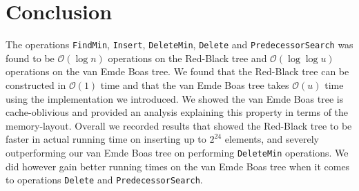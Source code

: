 \documentclass[a4paper,oneside,article,11pt]{memoir}
\begin{document}
\section{Conclusion}
The operations \texttt{FindMin}, \texttt{Insert}, \texttt{DeleteMin}, \texttt{Delete} and \texttt{PredecessorSearch} was found to be $\mathcal{O}(\log n)$ operations on the Red-Black tree and $\mathcal{O}(\log \log u)$ operations on the van Emde Boas tree. We found that the Red-Black tree can be constructed in $\mathcal{O}(1)$ time and that the van Emde Boas tree takes $\mathcal{O}(u)$ time using the implementation we introduced. We showed the van Emde Boas tree is cache-oblivious and provided an analysis explaining this property in terms of the memory-layout. Overall we recorded results that showed the Red-Black tree to be faster in actual running time on inserting up to $2^{24}$ elements, and severely outperforming our van Emde Boas tree on performing \texttt{DeleteMin} operations. We did however gain better running times on the van Emde Boas tree when it comes to operations \texttt{Delete} and \texttt{PredecessorSearch}.



\end{document}
